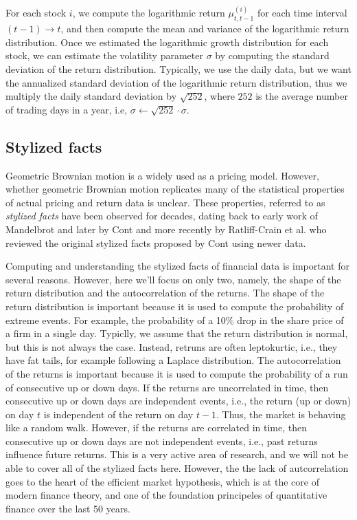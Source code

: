\documentclass[11pt]{article}
\theoremstyle{definition}
\begin{document}
For each stock $i$, we compute the logarithmic return $\mu^{(i)}_{t,t-1}$ for each time interval $(t-1)\rightarrow{t}$, and then compute the mean and variance of the logarithmic return distribution.
Once we estimated the logarithmic growth distribution for each stock, we can estimate the volatility parameter $\sigma$ by computing the standard deviation of the return distribution.
Typically, we use the daily data, but we want the annualized standard deviation of the logarithmic return distribution, thus we multiply the daily standard deviation by $\sqrt{252}$, where $252$ is the average number of trading days in a year, 
i.e, $\sigma\leftarrow \sqrt{252}\cdot\sigma$.

\subsection{Stylized facts}
Geometric Brownian motion is a widely used as a pricing model. 
However, whether geometric Brownian motion replicates many of the statistical properties of actual pricing and return data is unclear. 
These properties, referred to as \textit{stylized facts} have been observed for decades, 
dating back to early work of Mandelbrot \cite{Mandelbrot-1963,Mandelbrot-1967} and later by Cont \cite{Cont-QuantFinance-2001} 
and more recently by Ratliff-Crain et al. \cite{ratliffcrain2023revisiting} who reviewed the original stylized facts 
proposed by Cont using newer data.

Computing and understanding the stylized facts of financial data is important for several reasons. 
However, here we'll focus on only two, namely, the shape of the return distribution and the autocorrelation of the returns.
The shape of the return distribution is important because it is used to compute the probability of extreme events.
For example, the probability of a 10\% drop in the share price of a firm in a single day. 
Typiclly, we assume that the return distribution is normal, but this is not always the case. 
Instead, retruns are often leptokurtic, i.e., they have fat tails, for example following a Laplace distribution.
The autocorrelation of the returns is important because it is used to compute the probability of a run of consecutive up or down days.
If the returns are uncorrelated in time, then consecutive up or down days are independent events, i.e., 
the return (up or down) on day $t$ is independent of the return on day $t-1$. Thus, the market is behaving like a random walk.
However, if the returns are correlated in time, then consecutive up or down days are not independent events, i.e., 
past returns influence future returns. This is a very active area of research, and we will not be able to cover all of the stylized facts here. However, the 
the lack of autcorrelation goes to the heart of the efficient market hypothesis, which is at the core of modern finance theory, 
and one of the foundation principeles of quantitative finance over the last 50 years.
\end{document}
